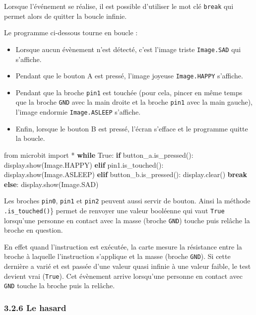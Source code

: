 \documentclass[a4paper,17pt]{extarticle}
\providecommand{\tightlist}{%
      \setlength{\itemsep}{0pt}\setlength{\parskip}{0pt}}
\newenvironment{Shaded}{}{}
\newcommand{\NormalTok}[1]{{#1}}
\newcommand{\ImportTok}[1]{{#1}}
\newcommand{\VariableTok}[1]{\textcolor[rgb]{0.10,0.09,0.49}{{#1}}}
\newcommand{\ControlFlowTok}[1]{\textcolor[rgb]{0.00,0.44,0.13}{\textbf{{#1}}}}
\newcommand{\OperatorTok}[1]{\textcolor[rgb]{0.40,0.40,0.40}{{#1}}}
\begin{document}
Lorsque l'événement se réalise, il est possible d'utiliser le mot clé
\texttt{break} qui permet alors de quitter la boucle infinie.
\begin{exemple}
    Le programme ci-dessous tourne en boucle :

\begin{itemize}
\tightlist
\item
  Lorsque aucun évènement n'est détecté, c'est l'image triste
  \texttt{Image.SAD} qui s'affiche.
\item
  Pendant que le bouton A est pressé, l'image joyeuse
  \texttt{Image.HAPPY} s'affiche.
\item
  Pendant que la broche \texttt{pin1} est touchée (pour cela, pincer en
  même temps que la broche \texttt{GND} avec la main droite et la broche
  \texttt{pin1} avec la main gauche), l'image endormie
  \texttt{Image.ASLEEP} s'affiche.
\item
  Enfin, lorsque le bouton B est pressé, l'écran s'efface et le
  programme quitte la boucle.
\end{itemize}

\begin{Shaded}
\begin{Highlighting}[]
\ImportTok{from}\NormalTok{ microbit }\ImportTok{import} \OperatorTok{*}
\ControlFlowTok{while} \VariableTok{True}\NormalTok{:}
    \ControlFlowTok{if}\NormalTok{ button\_a.is\_pressed():}
\NormalTok{        display.show(Image.HAPPY)}
    \ControlFlowTok{elif}\NormalTok{ pin1.is\_touched():}
\NormalTok{        display.show(Image.ASLEEP)}
    \ControlFlowTok{elif}\NormalTok{ button\_b.is\_pressed():}
\NormalTok{        display.clear()}
        \ControlFlowTok{break}
    \ControlFlowTok{else}\NormalTok{:}
\NormalTok{        display.show(Image.SAD)}
\end{Highlighting}
\end{Shaded}

        \end{exemple}\begin{remarque}
    Les broches \texttt{pin0}, \texttt{pin1} et \texttt{pin2} peuvent aussi
servir de bouton. Ainsi la méthode \texttt{.is\_touched()}\} permet de
renvoyer une valeur booléenne qui vaut \texttt{True} lorsqu'une personne
en contact avec la masse (broche \texttt{GND}) touche puis relâche la
broche en question.

En effet quand l'instruction est exécutée, la carte mesure la résistance
entre la broche à laquelle l'instruction s'applique et la masse (broche
\texttt{GND}). Si cette dernière a varié et est passée d'une valeur
quasi infinie à une valeur faible, le test devient vrai (\texttt{True}).
Cet évènement arrive lorsqu'une personne en contact avec \texttt{GND}
touche la broche puis la relâche.

        \end{remarque}
    \hypertarget{le-hasard}{%
\subsubsection{3.2.6 Le hasard}\label{le-hasard}}
\end{document}
